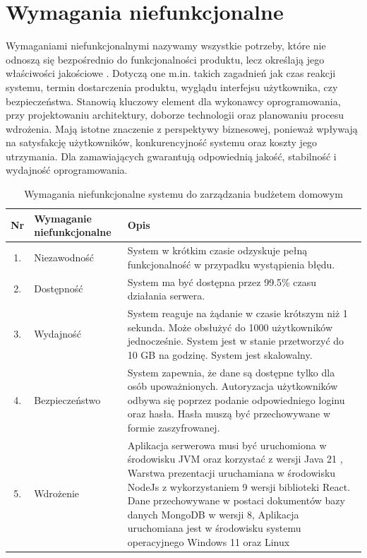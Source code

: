 \section{Wymagania niefunkcjonalne}
Wymaganiami niefunkcjonalnymi nazywamy wszystkie potrzeby, które nie odnoszą się bezpośrednio do funkcjonalności produktu, lecz określają jego właściwości jakościowe \cite{Wymagania}. Dotyczą one m.in. takich zagadnień jak czas reakcji systemu, termin dostarczenia produktu, wyglądu interfejsu użytkownika, czy bezpieczeństwa. Stanowią kluczowy element dla wykonawcy oprogramowania, przy projektowaniu architektury, doborze technologii oraz planowaniu procesu wdrożenia. Mają istotne znaczenie z perspektywy biznesowej, ponieważ wpływają na satysfakcję użytkowników, konkurencyjność systemu oraz koszty jego utrzymania. Dla zamawiających gwarantują odpowiednią jakość, stabilność i wydajność oprogramowania. 

\begin{longtable}{|c|p{3.1cm}|p{9.9cm}|}
		\caption{Wymagania niefunkcjonalne systemu do zarządzania budżetem domowym}
	\label{tab:wymagania_niefunkcjonalne} \\
	\hline
	\textbf{Nr} & \textbf{Wymaganie niefunkcjonalne} & \textbf{Opis} \\ \hline
	
	1. & Niezawodność & System w krótkim czasie odzyskuje pełną funkcjonalność w przypadku wystąpienia błędu. \\ \hline
	2. & Dostępność & System ma być dostępna przez 99.5\% czasu działania serwera.\\ \hline
	3. & Wydajność & System reaguje na żądanie w czasie krótszym niż 1 sekunda. Może obsłużyć do 1000 użytkowników jednocześnie. System jest w stanie przetworzyć do 10 GB na godzinę.  System jest skalowalny.\\ \hline
	4. & Bezpieczeństwo & System zapewnia, że dane są dostępne tylko dla osób upoważnionych. Autoryzacja użytkowników odbywa się poprzez podanie odpowiedniego loginu oraz hasła. Hasła muszą być przechowywane w formie zaszyfrowanej. \\ \hline
	5. & Wdrożenie & Aplikacja serwerowa musi być uruchomiona w środowisku JVM oraz korzystać z wersji Java 21 , Warstwa prezentacji uruchamiana w środowisku NodeJs z wykorzystaniem 9 wersji biblioteki React. Dane przechowywane w postaci dokumentów bazy danych MongoDB w wersji 8, Aplikacja uruchomiana jest w środowisku systemu operacyjnego Windows 11 oraz Linux \\ \hline
	
\end{longtable}


